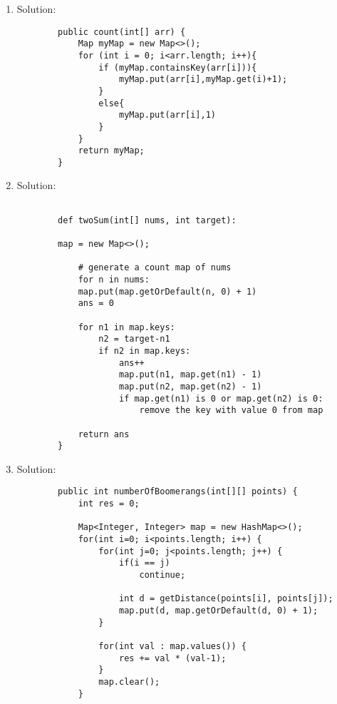 \documentclass{article}
\begin{document}
    \begin{enumerate}
        \item Solution:
        \begin{lstlisting}
        public count(int[] arr) {
            Map myMap = new Map<>();
            for (int i = 0; i<arr.length; i++){
                if (myMap.containsKey(arr[i])){
                    myMap.put(arr[i],myMap.get(i)+1);
                }
                else{
                    myMap.put(arr[i],1)
                }
            }
            return myMap;
        }
        \end{lstlisting}

        \item Solution:

        \begin{lstlisting}

        def twoSum(int[] nums, int target):

        map = new Map<>();

            # generate a count map of nums
            for n in nums:
            map.put(map.getOrDefault(n, 0) + 1)
            ans = 0

            for n1 in map.keys:
                n2 = target-n1
                if n2 in map.keys:
                    ans++
                    map.put(n1, map.get(n1) - 1)
                    map.put(n2, map.get(n2) - 1)
                    if map.get(n1) is 0 or map.get(n2) is 0:
                        remove the key with value 0 from map

            return ans
        }
        \end{lstlisting}

        \item Solution:

        \begin{lstlisting}
        public int numberOfBoomerangs(int[][] points) {
            int res = 0;

            Map<Integer, Integer> map = new HashMap<>();
            for(int i=0; i<points.length; i++) {
                for(int j=0; j<points.length; j++) {
                    if(i == j)
                        continue;

                    int d = getDistance(points[i], points[j]);
                    map.put(d, map.getOrDefault(d, 0) + 1);
                }

                for(int val : map.values()) {
                    res += val * (val-1);
                }
                map.clear();
            }


\end{lstlisting}
\end{enumerate}
\end{document}

